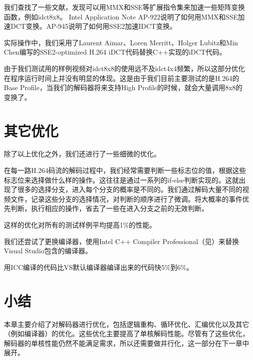 我们查找了一些文献，发现可以用MMX和SSE等扩展指令集来加速一些矩阵变换函数，例如idct8x8。
Intel Application Note AP-922\cite{intel-ap922}说明了如何用MMX和SSE加速DCT变换。AP-945\cite{intel-ap945}说明了如何用SSE2加速IDCT变换。

实际操作中，我们采用了Laurent Aimar、Loren Merritt、Holger Lubitz和Min Chen编写的SSE2-optimized H.264 iDCT代码替换C++实现的iDCT代码。

由于我们测试用的样例视频对idct8x8的使用远不及idct4x4频繁，所以这部分优化在程序运行时间上并没有明显的体现。这是由于我们目前主要测试的是H.264的Base Profile，当我们的解码器将来支持High Profile的时候，就会大量调用8x8的变换了。

\section{其它优化}
\label{sec:singlecoreothers}

除了以上优化之外，我们还进行了一些细微的优化。

在每一路H.264码流的解码过程中，我们经常需要判断一些标志位的值，根据这些标志位来选择做什么样的操作。这往往是通过一系列的if-else判断实现的。这就出现了很多的选择分支，进入每个分支的概率是不同的。我们通过解码大量不同的视频文件，记录这些分支的选择情况，对判断的顺序进行了微调。将大概率的事件优先判断，执行相应的操作，省去了一些在进入分支之前的无效判断。

这样的优化对所有的测试样例平均提高1\%的性能。

我们还尝试了更换编译器，使用Intel C++ Compiler Professional（见）来替换Visual Studio包含的编译器。

用ICC编译的代码比VS默认编译器编译出来的代码快5\%到6\%。

\section{小结}
\label{sec:sum4}
本章主要介绍了对解码器进行优化，包括逻辑重构、循环优化、汇编优化以及其它（例如编译器）的优化。这些优化主要提高了单核解码性能。尽管有了这些优化，解码器的单核性能仍然不能满足需求，所以还需要做并行化，这一部分在下一章中展开。


